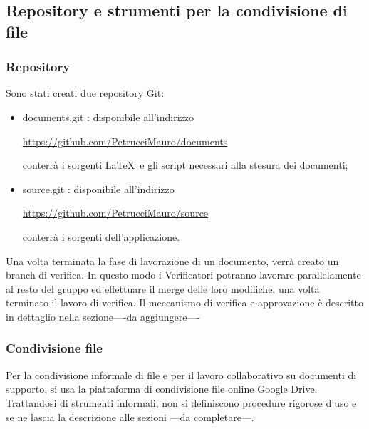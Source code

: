 \subsection{Repository e strumenti per la condivisione di file}

\subsubsection{Repository}
Sono stati creati due repository  Git:
\begin{itemize}


\item documents.git  : disponibile all’indirizzo\\
\begin{center}\url{https://github.com/PetrucciMauro/documents}\\\end{center}
conterrà i sorgenti \LaTeX \ e gli script necessari alla stesura dei documenti;
\item source.git : disponibile all’indirizzo\\
\begin{center}
\url{https://github.com/PetrucciMauro/source}\\
\end{center}
conterrà i sorgenti dell’applicazione.\\
\end{itemize}
Una volta terminata la fase di lavorazione di un documento, verrà creato un branch di verifica. In questo modo i Verificatori potranno lavorare parallelamente al resto del gruppo ed effettuare il merge  delle loro modifiche, una volta terminato il lavoro di verifica.
Il meccanismo di verifica e approvazione è descritto in dettaglio nella sezione----da aggiungere----


\subsubsection{Condivisione file}
Per la condivisione informale di file e per il lavoro collaborativo su documenti di supporto, si usa la piattaforma di condivisione file online Google Drive.
Trattandosi di strumenti informali, non si definiscono procedure rigorose d’uso e se ne lascia la descrizione alle sezioni ---da completare---.